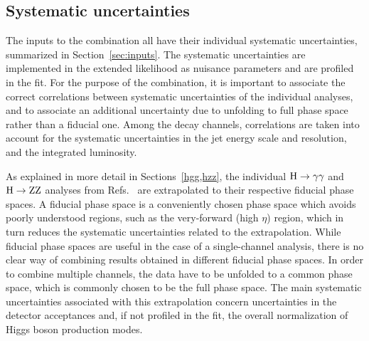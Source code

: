 \subsection{Systematic uncertainties}
\label{sec:systematics}


The inputs to the combination all have their individual systematic uncertainties, summarized in Section~\ref{sec:inputs}.
% 
The systematic uncertainties are implemented in the extended likelihood as nuisance parameters and are profiled in the fit.
% 
For the purpose of the combination, it is important to associate the correct correlations between systematic uncertainties of the individual analyses, and to associate an additional uncertainty due to unfolding to full phase space rather than a fiducial one.
% 
Among the decay channels, correlations are taken into account for the systematic uncertainties in the jet energy scale and resolution, and the integrated luminosity.


As explained in more detail in Sections~\ref{hgg,hzz}, the individual $\mathrm{H}\to\mathrm{\gamma}\mathrm{\gamma}$ and $\mathrm{H}\to\mathrm{Z}\mathrm{Z}$ analyses from Refs.~\cite{Sirunyan:2018kta,Sirunyan:2017exp} are extrapolated to their respective fiducial phase spaces.
% 
A fiducial phase space is a conveniently chosen phase space which avoids poorly understood regions, such as the very-forward (high $\eta$) region, which in turn reduces the systematic uncertainties related to the extrapolation.
% 
While fiducial phase spaces are useful in the case of a single-channel analysis, there is no clear way of combining results obtained in different fiducial phase spaces.
% 
In order to combine multiple channels, the data have to be unfolded to a common phase space, which is commonly chosen to be the full phase space.
% 
The main systematic uncertainties associated with this extrapolation concern uncertainties in the detector acceptances and, if not profiled in the fit, the overall normalization of Higgs boson production modes.



